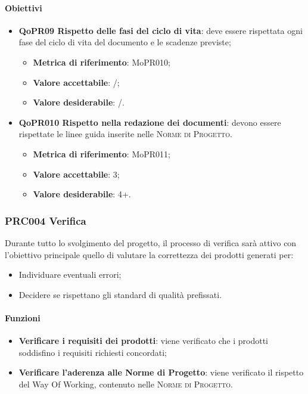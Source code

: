 \documentclass[../piano-di-qualifica.tex]{subfiles}
\begin{document}
\paragraph{Obiettivi}
\label{sub:obiettivi_3}
\begin{itemize}
    \item \textbf{QoPR09 Rispetto delle fasi del ciclo di vita}: deve essere rispettata ogni fase del ciclo di vita del documento e le scadenze previste;
        \begin{itemize}
            \item \textbf{Metrica di riferimento}: MoPR010;
            \item \textbf{Valore accettabile}: /; %
            \item \textbf{Valore desiderabile}: /.
        \end{itemize}
    \item \textbf{QoPR010 Rispetto nella redazione dei documenti}: devono essere rispettate le linee guida inserite nelle \textsc{Norme di Progetto}.
        \begin{itemize}
            \item \textbf{Metrica di riferimento}: MoPR011;
            \item \textbf{Valore accettabile}: 3; %
            \item \textbf{Valore desiderabile}: 4+.
        \end{itemize}
\end{itemize}

\subsubsection{PRC004 Verifica}
\label{sub:produzione_dei_documenti}
Durante tutto lo svolgimento del progetto, il processo di verifica sarà attivo con l'obiettivo principale quello di valutare la correttezza dei prodotti generati per: 
\begin{itemize}
    \item Individuare eventuali errori;
    \item Decidere se rispettano gli standard di qualità prefissati.
\end{itemize}

\paragraph{Funzioni}
\label{sub:funzioni_4}
\begin{itemize}
    \item \textbf{Verificare i requisiti dei prodotti}: viene verificato che i prodotti soddisfino i requisiti richiesti concordati;
    \item \textbf{Verificare l'aderenza alle Norme di Progetto}: viene verificato il rispetto del Way Of Working, contenuto nelle \textsc{Norme di Progetto}.
\end{itemize}
\end{document}
